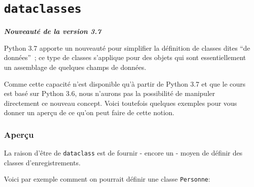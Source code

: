     
    
    
    

    

    \hypertarget{dataclasses}{%
\section{\texorpdfstring{\texttt{dataclasses}}{dataclasses}}\label{dataclasses}}

\textbf{\emph{Nouveauté de la version 3.7}}

Python 3.7 apporte un nouveauté pour simplifier la définition de classes
dites ``de données''~; ce type de classes s'applique pour des objets qui
sont essentiellement un assemblage de quelques champs de données.

    Comme cette capacité n'est disponible qu'à partir de Python 3.7 et que
le cours est basé sur Python 3.6, nous n'aurons pas la possibilité de
manipuler directement ce nouveau concept. Voici toutefois quelques
exemples pour vous donner un aperçu de ce qu'on peut faire de cette
notion.

    \hypertarget{aperuxe7u}{%
\subsubsection{Aperçu}\label{aperuxe7u}}

    La raison d'être de \texttt{dataclass} est de fournir - encore un -
moyen de définir des classes d'enregistrements.

Voici par exemple comment on pourrait définir une classe
\texttt{Personne}:

    \begin{Shaded}
\begin{Highlighting}[frame=lines,framerule=0.6mm,rulecolor=\color{asisframecolor}]
\OperatorTok{>>>} 
\OperatorTok{>>>}
\OperatorTok{>>>} 
 \OperatorTok{=} 
\OperatorTok{>>>}\OperatorTok{=}\OperatorTok{=}\OperatorTok{=}\NormalTok{)}
\OperatorTok{>>>}
\OperatorTok{>>>} 
\OperatorTok{=}\OperatorTok{=}\OperatorTok{=}\NormalTok{)}
\OperatorTok{>>>}
\end{Highlighting}
\end{Shaded}


